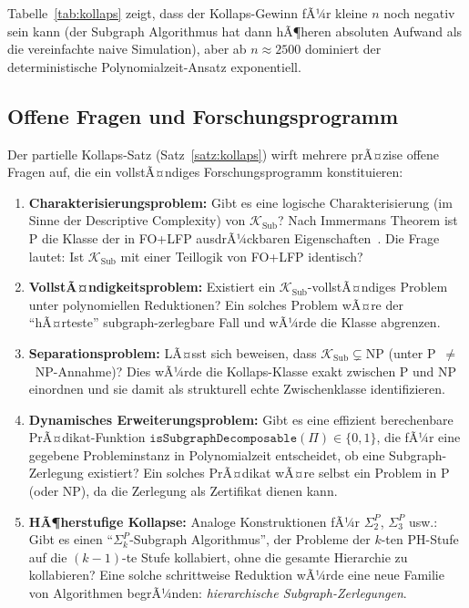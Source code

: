 ﻿\documentclass[a4paper,12pt]{article}
\theoremstyle{definition}
\begin{document}
Tabelle~\ref{tab:kollaps} zeigt, dass der Kollaps-Gewinn fÃ¼r kleine $n$ noch
negativ sein kann (der Subgraph Algorithmus hat dann hÃ¶heren absoluten Aufwand
als die vereinfachte naive Simulation), aber ab $n \approx 2500$ dominiert
der deterministische Polynomialzeit-Ansatz exponentiell.

\subsection{Offene Fragen und Forschungsprogramm}

Der partielle Kollaps-Satz (Satz~\ref{satz:kollaps}) wirft mehrere prÃ¤zise
offene Fragen auf, die ein vollstÃ¤ndiges Forschungsprogramm konstituieren:

\begin{enumerate}
  \item \textbf{Charakterisierungsproblem:}
        Gibt es eine logische Charakterisierung (im Sinne der Descriptive Complexity)
        von $\mathcal{K}_\mathrm{Sub}$?
        Nach Immermans Theorem ist P die Klasse der in FO+LFP ausdrÃ¼ckbaren Eigenschaften~\cite{immerman1999descriptive}.
        Die Frage lautet: Ist $\mathcal{K}_\mathrm{Sub}$ mit einer Teillogik von FO+LFP identisch?

  \item \textbf{VollstÃ¤ndigkeitsproblem:}
        Existiert ein $\mathcal{K}_\mathrm{Sub}$-vollstÃ¤ndiges Problem unter
        polynomiellen Reduktionen? Ein solches Problem wÃ¤re der ``hÃ¤rteste''
        subgraph-zerlegbare Fall und wÃ¼rde die Klasse abgrenzen.

  \item \textbf{Separationsproblem:}
        LÃ¤sst sich beweisen, dass $\mathcal{K}_\mathrm{Sub} \subsetneq \mathrm{NP}$
        (unter P~$\neq$~NP-Annahme)? Dies wÃ¼rde die Kollaps-Klasse exakt
        zwischen P und NP einordnen und sie damit als strukturell echte
        Zwischenklasse identifizieren.

  \item \textbf{Dynamisches Erweiterungsproblem:}
        Gibt es eine effizient berechenbare PrÃ¤dikat-Funktion
        $\mathtt{isSubgraphDecomposable}(\Pi) \in \{0,1\}$,
        die fÃ¼r eine gegebene Probleminstanz in Polynomialzeit entscheidet,
        ob eine Subgraph-Zerlegung existiert? Ein solches PrÃ¤dikat wÃ¤re
        selbst ein Problem in P (oder NP), da die Zerlegung als Zertifikat dienen kann.

  \item \textbf{HÃ¶herstufige Kollapse:}
        Analoge Konstruktionen fÃ¼r $\Sigma_2^P$, $\Sigma_3^P$ usw.:
        Gibt es einen ``$\Sigma_k^P$-Subgraph Algorithmus'', der Probleme
        der $k$-ten PH-Stufe auf die $(k-1)$-te Stufe kollabiert,
        ohne die gesamte Hierarchie zu kollabieren?
        Eine solche schrittweise Reduktion wÃ¼rde eine neue Familie von
        Algorithmen begrÃ¼nden: \emph{hierarchische Subgraph-Zerlegungen}.
\end{enumerate}
\end{document}
